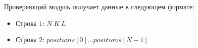 Проверяющий модуль получает данные в следующем формате:

\begin{itemize}
\item Строка $1$: $N\ K\ L$
\item Строка $2$: $positions[0] \ldots positions[N - 1]$
\end{itemize}